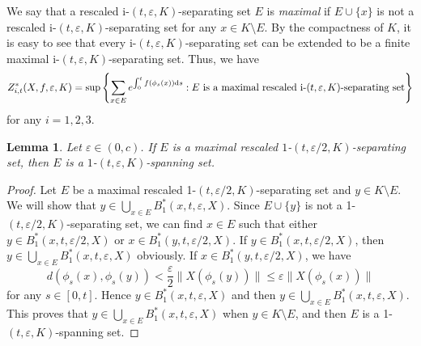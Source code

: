\documentclass[10pt]{article}
\newtheorem*{Theorem A}{Theorem A}
\newtheorem{Lemma}[Theorem]{Lemma}
\begin{document}
We say that a rescaled i-$(t, \varepsilon, K)$-separating set $E$ is {\it maximal} if $E\cup\{x\}$ is not a rescaled i-$(t, \varepsilon, K)$-separating set for any $x\in K\setminus E$. By the compactness of $K$, it is easy to see that every i-$(t, \varepsilon, K)$-separating set can be extended to be a finite maximal i-$(t, \varepsilon, K)$-separating set. Thus, we have
$$Z_{i,t}^*(X, f, \varepsilon,K) = \sup\left\{ \sum_{x \in E} e^{\int_0^t f(\phi_s (x)) {\rm d}s} : E \text{ is a maximal rescaled i-}(t,\varepsilon,K)\text{-separating set} \right\}$$
for any $i=1,2,3$.

\begin{Lemma}\label{lemma5.2}
Let $\varepsilon\in(0, c)$. If $E$ is a maximal rescaled $1$-$(t, \varepsilon/2, K)$-separating set, then $E$ is a $1$-$(t, \varepsilon, K)$-spanning set.
\end{Lemma}

\begin{proof}
Let $E$ be a maximal rescaled 1-$(t, \varepsilon/2, K)$-separating set and $y\in K\setminus E$. We will show that $y\in\bigcup\limits_{x\in E}B_1^*(x, t, \varepsilon, X)$. Since $E\cup\{y\}$ is not a 1-$(t, \varepsilon/2, K)$-separating set, we can find $x\in E$ such that either $y\in B_1^*(x, t, \varepsilon/2, X)$ or $x\in B_1^*(y, t, \varepsilon/2, X)$. If $y\in B_1^*(x, t, \varepsilon/2, X)$, then $y\in\bigcup\limits_{x\in E}B_1^*(x, t, \varepsilon, X)$ obviously. If $x\in B_1^*(y, t, \varepsilon/2, X)$, we have
$$d(\phi_s(x),\phi_s(y))<\frac{\varepsilon}{2}\|X(\phi_s(y))\|\leq\varepsilon\|X(\phi_s(x))\|$$
for any $s\in[0,t]$. Hence $y\in B_1^*(x, t, \varepsilon, X)$ and then $y\in\bigcup\limits_{x\in E}B_1^*(x, t, \varepsilon, X)$. This proves that $y\in\bigcup\limits_{x\in E}B_1^*(x, t, \varepsilon, X)$ when $y\in K\setminus E$, and then $E$ is a 1-$(t, \varepsilon, K)$-spanning set.
\end{proof}
\end{document}
